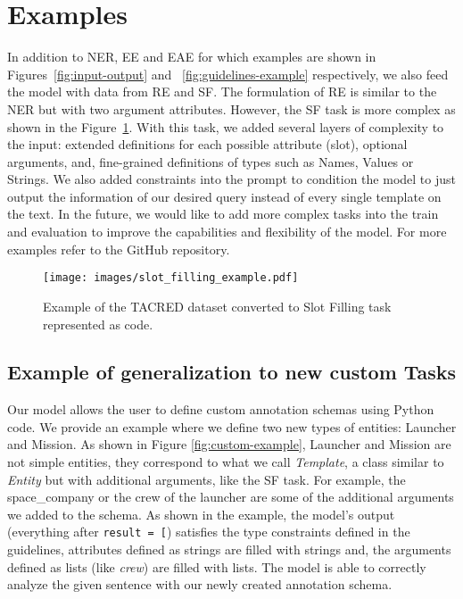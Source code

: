 \documentclass{article} \usepackage{iclr2024_conference,times}
\begin{document}




\clearpage

\appendix
\section{Examples}
\label{ap:repr_examples}

In addition to NER, EE and EAE for which examples are shown in Figures~\ref{fig:input-output} and ~\ref{fig:guidelines-example} respectively, we also feed the model with data from RE and SF. The formulation of RE is similar to the NER but with two argument attributes. However, the SF task is more complex as shown in the Figure~\ref{fig:slot_filling_example}. With this task, we added several layers of complexity to the input: extended definitions for each possible attribute (slot), optional arguments, and, fine-grained definitions of types such as Names, Values or Strings. We also added constraints into the prompt to condition the model to just output the information of our desired query instead of every single template on the text. In the future, we would like to add more complex tasks into the train and evaluation to improve the capabilities and flexibility of the model. For more examples refer to the GitHub repository.

\begin{figure}[htb]
    \centering
    \texttt{[image: images/slot\_filling\_example.pdf]}
    \caption{Example of the TACRED dataset converted to Slot Filling task represented as code.}
    \label{fig:slot_filling_example}
\end{figure}

\subsection{Example of generalization to new custom Tasks}

Our model allows the user to define custom annotation schemas using Python code.
We provide an example where we define two new types of entities: Launcher and Mission.
As shown in Figure \ref{fig:custom-example}, Launcher and Mission are not simple entities, they correspond to what we call \textit{Template}, a class similar to \textit{Entity} but with additional arguments, like the SF task.
For example, the space\_company or the crew of the launcher are some of the additional arguments we added to the schema. 
As shown in the example, the model's output (everything after \texttt{result = [}) satisfies the type constraints defined in the guidelines, attributes defined as strings are filled with strings and, the arguments defined as lists (like \textit{crew}) are filled with lists. 
The model is able to correctly analyze the given sentence with our newly created annotation schema.
\end{document}
